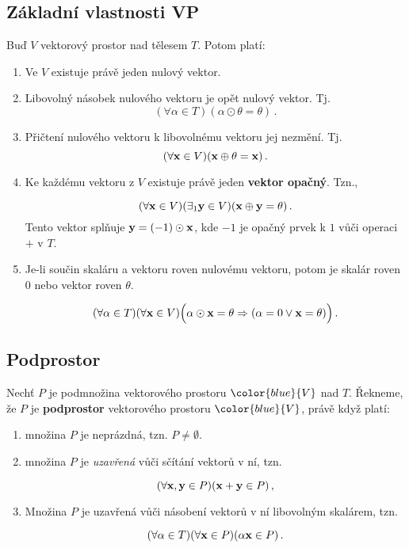 \subsection*{Základní vlastnosti VP}

Buď $V$ vektorový prostor nad tělesem $T$. Potom platí:

\begin{enumerate}
    \item Ve $V$ existuje právě jeden nulový vektor.
    \item Libovolný násobek nulového vektoru je opět nulový vektor. Tj.
          \[ (\forall \alpha\in T) (\alpha\odot\theta=\theta)\,. \]
    \item Přičtení nulového vektoru k libovolnému vektoru jej nezmění. Tj.
          \[ (\forall \mathbf{x}\in V) (\mathbf{x} \oplus \theta=\mathbf{x})\,. \]

    \item Ke každému vektoru z $V$ existuje právě jeden \textbf{vektor opačný}. Tzn.,

          \[ (\forall \mathbf{x}\in V)(\exists_{1} \mathbf{y}\in V)( \mathbf{x}\oplus\mathbf{y}=\theta)\,. \]
          Tento vektor splňuje $\mathbf{y}= (-1)\odot \mathbf{x}$, kde $-1$ je opačný prvek k $1$ vůči
          operaci $+$ v $T$.
    \item Je-li součin skaláru a vektoru roven nulovému vektoru, potom je skalár roven
          $0$ nebo vektor roven $\theta$.

          \[ (\forall \alpha \in T) (\forall \mathbf{x} \in V)  \Big(\alpha\odot  \mathbf{x}=\theta \Rightarrow (\alpha=0 \vee \mathbf{x}=\theta)\Big)\,. \]
\end{enumerate}

\subsection*{Podprostor}

Nechť $P$ je podmnožina vektorového prostoru $\color{blue}{V}$ nad $T$.
Řekneme, že $P$ je \textbf{podprostor} vektorového prostoru $\color{blue}{V}$,
právě když platí:

\begin{enumerate}
    \item množina $P$ je neprázdná, tzn. $P\neq \emptyset.$
    \item množina $P$ je \emph{uzavřená} vůči sčítání vektorů v ní, tzn.

          \[ (\forall \mathbf{x},\mathbf{y}\in P)(\mathbf{x}+\mathbf{y}\in P)\,, \]

    \item Množina $P$ je uzavřená vůči násobení vektorů v ní libovolným skalárem, tzn.

          \[ (\forall\alpha\in T)(\forall \mathbf{x}\in P) (\alpha \mathbf{x}\in P)\,. \]

\end{enumerate}

